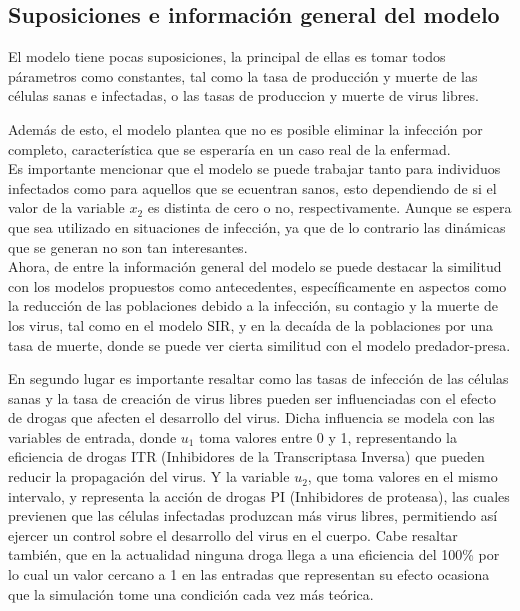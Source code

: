 \documentclass{article}
\begin{document}
    \newpage

    \subsection{Suposiciones e información general del modelo}

    El modelo tiene pocas suposiciones, la principal de ellas es tomar todos
    párametros como constantes, tal como la tasa de producción y muerte de las
    células sanas e infectadas, o las tasas de produccion y muerte de virus libres.

    Además de esto, el modelo plantea que no es posible eliminar la infección
    por completo, característica que se esperaría en un caso real de la
    enfermad.\\

    Es importante mencionar que el modelo se puede trabajar tanto para
    individuos infectados como para aquellos que se ecuentran sanos, esto dependiendo
    de si el valor de la variable $x_2$ es distinta de cero o no, respectivamente.
    Aunque se espera que sea utilizado en situaciones de infección, ya que de lo
    contrario las dinámicas que se generan no son tan interesantes.\\

    Ahora, de entre la información general del modelo se puede destacar
    la similitud con los modelos propuestos como antecedentes, específicamente
    en aspectos como la reducción de las poblaciones debido a la infección, su
    contagio y la muerte de los virus, tal como en el modelo SIR, y en la
    decaída de la poblaciones por una tasa de muerte, donde se puede ver cierta
    similitud con el modelo predador-presa.

    En segundo lugar es importante resaltar como las tasas de infección de las
    células sanas y la tasa de creación de virus libres pueden ser
    influenciadas con el efecto de drogas que afecten el desarrollo del virus.
    Dicha influencia se modela con las variables de entrada, donde $u_1$
    toma valores entre 0 y 1, representando la eficiencia de drogas ITR
    (Inhibidores de la Transcriptasa Inversa) que pueden reducir la propagación
    del virus. Y la variable $u_2$, que toma valores en el mismo intervalo, y
    representa la acción de drogas PI (Inhibidores de proteasa), las cuales
    previenen que las células infectadas produzcan más virus libres,
    permitiendo así ejercer un control sobre el desarrollo del virus en el
    cuerpo. Cabe resaltar también, que en la actualidad ninguna droga llega a una
    eficiencia del 100\% por lo cual un valor cercano a 1 en las entradas que
    representan su efecto ocasiona que la simulación tome una condición cada vez
    más teórica.\cite{model}\\
\end{document}
